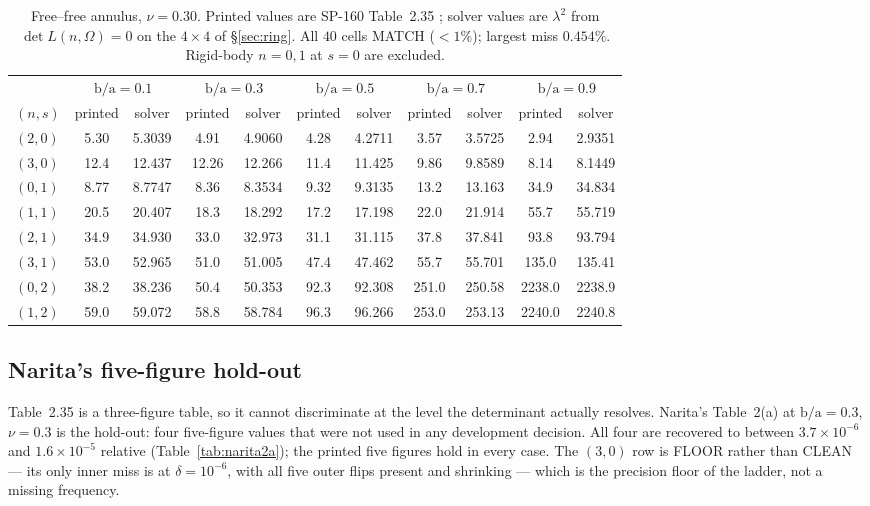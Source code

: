 \documentclass[11pt]{article}
\newcommand{\lamsq}{\lambda^{2}}
\newcommand{\ba}{\mbox{b/a}}
\begin{document}
\begin{table}[htbp]\centering\footnotesize
\caption{Free--free annulus, $\nu=0.30$. Printed values are
SP-160 Table~2.35 \cite{leissaSP160,vogelSkinner}; solver values are
$\lamsq$ from $\det L(n,\Omega)=0$ on the $4\times4$ of
\S\ref{sec:ring}. All $40$ cells MATCH ($<1\%$); largest miss $0.454\%$.
Rigid-body $n=0,1$ at $s=0$ are excluded.}
\label{tab:t235-nu30}
\begin{tabular}{lcccccccccc}
\toprule
& \multicolumn{2}{c}{$\ba=0.1$} & \multicolumn{2}{c}{$\ba=0.3$}
& \multicolumn{2}{c}{$\ba=0.5$} & \multicolumn{2}{c}{$\ba=0.7$}
& \multicolumn{2}{c}{$\ba=0.9$}\\
\cmidrule(lr){2-3}\cmidrule(lr){4-5}\cmidrule(lr){6-7}\cmidrule(lr){8-9}\cmidrule(lr){10-11}
$(n,s)$ & printed & solver & printed & solver & printed & solver
& printed & solver & printed & solver\\
\midrule
$(2,0)$ & 5.30 & 5.3039 & 4.91 & 4.9060 & 4.28 & 4.2711 & 3.57 & 3.5725 & 2.94 & 2.9351 \\
$(3,0)$ & 12.4 & 12.437 & 12.26 & 12.266 & 11.4 & 11.425 & 9.86 & 9.8589 & 8.14 & 8.1449 \\
$(0,1)$ & 8.77 & 8.7747 & 8.36 & 8.3534 & 9.32 & 9.3135 & 13.2 & 13.163 & 34.9 & 34.834 \\
$(1,1)$ & 20.5 & 20.407 & 18.3 & 18.292 & 17.2 & 17.198 & 22.0 & 21.914 & 55.7 & 55.719 \\
$(2,1)$ & 34.9 & 34.930 & 33.0 & 32.973 & 31.1 & 31.115 & 37.8 & 37.841 & 93.8 & 93.794 \\
$(3,1)$ & 53.0 & 52.965 & 51.0 & 51.005 & 47.4 & 47.462 & 55.7 & 55.701 & 135.0 & 135.41 \\
$(0,2)$ & 38.2 & 38.236 & 50.4 & 50.353 & 92.3 & 92.308 & 251.0 & 250.58 & 2238.0 & 2238.9 \\
$(1,2)$ & 59.0 & 59.072 & 58.8 & 58.784 & 96.3 & 96.266 & 253.0 & 253.13 & 2240.0 & 2240.8 \\
\bottomrule
\end{tabular}
\end{table}

\subsection{Narita's five-figure hold-out}\label{sec:narita2a}
Table~2.35 is a three-figure table, so it cannot discriminate at the level the
determinant actually resolves. Narita's Table~2(a) \cite{narita1984} at
$\ba=0.3$, $\nu=0.3$ is the hold-out: four five-figure values that were not
used in any development decision. All four are recovered to between
$3.7\times10^{-6}$ and $1.6\times10^{-5}$ relative
(Table~\ref{tab:narita2a}); the printed five figures hold in every case. The
$(3,0)$ row is FLOOR rather than CLEAN --- its only inner miss is at
$\delta=10^{-6}$, with all five outer flips present and shrinking --- which is
the precision floor of the ladder, not a missing frequency.
\end{document}
